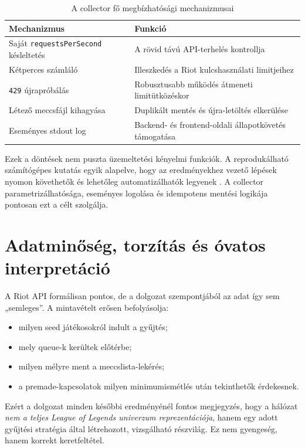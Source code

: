 \documentclass[a4paper,12pt]{report}
\begin{document}
\begin{table}[H]
\centering
\caption{A collector fő megbízhatósági mechanizmusai}
\begin{tabularx}{\textwidth}{>{\raggedright\arraybackslash}p{4.4cm}X}
\toprule
\textbf{Mechanizmus} & \textbf{Funkció} \\
\midrule
Saját \texttt{requestsPerSecond} késleltetés & A rövid távú API-terhelés kontrollja \\
Kétperces számláló & Illeszkedés a Riot kulcshasználati limitjeihez \\
\texttt{429} újrapróbálás & Robusztusabb működés átmeneti limitütközéskor \\
Létező meccsfájl kihagyása & Duplikált mentés és újra-letöltés elkerülése \\
Eseményes stdout log & Backend- és frontend-oldali állapotkövetés támogatása \\
\bottomrule
\end{tabularx}
\end{table}

Ezek a döntések nem puszta üzemeltetési kényelmi funkciók. A reprodukálható számítógépes kutatás egyik alapelve, hogy az eredményekhez vezető lépések nyomon követhetők és lehetőleg automatizálhatók legyenek \cite{sandve2013}. A collector parametrizálhatósága, eseményes logolása és idempotens mentési logikája pontosan ezt a célt szolgálja.

\section{Adatminőség, torzítás és óvatos interpretáció}

A Riot API formálisan pontos, de a dolgozat szempontjából az adat így sem „semleges”. A mintavételt erősen befolyásolja:

\begin{itemize}
    \item milyen seed játékosokról indult a gyűjtés;
    \item mely queue-k kerültek előtérbe;
    \item milyen mélyre ment a meccslista-lekérés;
    \item a premade-kapcsolatok milyen minimumismétlés után tekinthetők érdekesnek.
\end{itemize}

Ezért a dolgozat minden későbbi eredményénél fontos megjegyzés, hogy a hálózat \emph{nem a teljes League of Legends univerzum reprezentációja}, hanem egy adott gyűjtési stratégia által létrehozott, vizsgálható részvilág. Ez nem gyengeség, hanem korrekt keretfeltétel.
\end{document}
